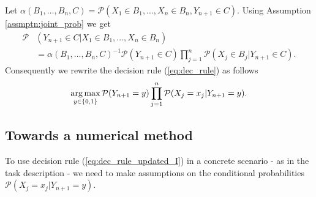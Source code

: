   Let $\alpha(B_{1}, \ldots, B_{n}, C)=\mathcal{P}(X_{1}\in B_{1}, \ldots, X_{n}\in B_{n}, Y_{n + 1}\in C)$. Using 
  Assumption \ref{assmptn:joint_prob} we get
	\begin{align*}
		\mathcal{P}&(Y_{n + 1}\in C|X_{1}\in B_{1}, \ldots, X_{n}\in B_{n}) \\
			&= \alpha(B_{1}, \ldots, B_{n}, C)^{-1}\mathcal{P}(Y_{n + 1}\in C)\prod_{j = 1}^{n}\mathcal{P}(X_{j}\in B_{j}|Y_{n + 1}\in C).
	\end{align*}
  Consequently we rewrite the decision rule (\ref{eq:dec_rule}) as follows
	\begin{align}\label{eq:dec_rule_updated_I}
		\operatorname*{arg\,max}_{y\in\{0, 1\}} \mathcal{P}(Y_{n + 1} = y) \prod_{j = 1}^{n}\mathcal{P}(X_{j}=x_{j}|Y_{n + 1}=y).
	\end{align}
  
	
\subsection{Towards a numerical method}

	To use decision rule (\ref{eq:dec_rule_updated_I}) in a concrete scenario - as in the task description - we need to make assumptions on
  the conditional probabilities $\mathcal{P}(X_{j} = x_{j}|Y_{n + 1} = y)$.

  
	
	

